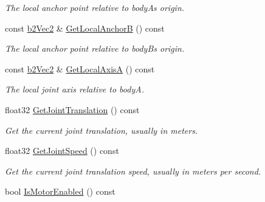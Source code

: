 \begin{DoxyCompactItemize}
\begin{DoxyCompactList}\small\item\em The local anchor point relative to bodyA\textquotesingle{}s origin. \end{DoxyCompactList}\item 
const \hyperlink{structb2_vec2}{b2\+Vec2} \& \hyperlink{classb2_wheel_joint_a38313bcd5d5a91f190956086b9d9b8e5}{Get\+Local\+AnchorB} () const \hypertarget{classb2_wheel_joint_a38313bcd5d5a91f190956086b9d9b8e5}{}\label{classb2_wheel_joint_a38313bcd5d5a91f190956086b9d9b8e5}

\begin{DoxyCompactList}\small\item\em The local anchor point relative to bodyB\textquotesingle{}s origin. \end{DoxyCompactList}\item 
const \hyperlink{structb2_vec2}{b2\+Vec2} \& \hyperlink{classb2_wheel_joint_a03c1a1cf19dbada68630aa3cbf970a55}{Get\+Local\+AxisA} () const \hypertarget{classb2_wheel_joint_a03c1a1cf19dbada68630aa3cbf970a55}{}\label{classb2_wheel_joint_a03c1a1cf19dbada68630aa3cbf970a55}

\begin{DoxyCompactList}\small\item\em The local joint axis relative to bodyA. \end{DoxyCompactList}\item 
float32 \hyperlink{classb2_wheel_joint_abc3791f9c8139e5c5ba0fb72d5c7f9df}{Get\+Joint\+Translation} () const \hypertarget{classb2_wheel_joint_abc3791f9c8139e5c5ba0fb72d5c7f9df}{}\label{classb2_wheel_joint_abc3791f9c8139e5c5ba0fb72d5c7f9df}

\begin{DoxyCompactList}\small\item\em Get the current joint translation, usually in meters. \end{DoxyCompactList}\item 
float32 \hyperlink{classb2_wheel_joint_a398bc3a1f807905e0923cc7d9bff640d}{Get\+Joint\+Speed} () const \hypertarget{classb2_wheel_joint_a398bc3a1f807905e0923cc7d9bff640d}{}\label{classb2_wheel_joint_a398bc3a1f807905e0923cc7d9bff640d}

\begin{DoxyCompactList}\small\item\em Get the current joint translation speed, usually in meters per second. \end{DoxyCompactList}\item 
bool \hyperlink{classb2_wheel_joint_a419bc80e17cc4c1062a692ea79396d19}{Is\+Motor\+Enabled} () const \hypertarget{classb2_wheel_joint_a419bc80e17cc4c1062a692ea79396d19}{}\label{classb2_wheel_joint_a419bc80e17cc4c1062a692ea79396d19}


\end{DoxyCompactItemize}
